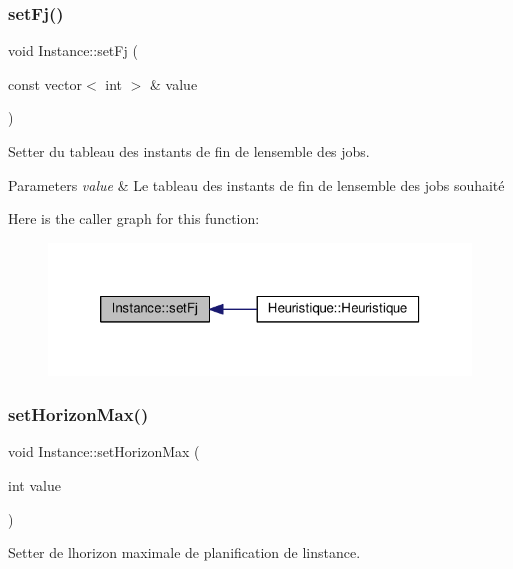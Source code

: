 \subsubsection{\texorpdfstring{set\+Fj()}{setFj()}}
{\footnotesize\ttfamily void Instance\+::set\+Fj (\begin{DoxyParamCaption}\item[{const vector$<$ int $>$ \&}]{value }\end{DoxyParamCaption})}



Setter du tableau des instants de fin de l\textquotesingle{}ensemble des jobs. 


\begin{DoxyParams}{Parameters}
{\em value} & Le tableau des instants de fin de l\textquotesingle{}ensemble des jobs souhaité \\
\hline
\end{DoxyParams}
Here is the caller graph for this function\+:\nopagebreak
\begin{figure}[H]
\begin{center}
\leavevmode
\includegraphics[width=320pt]{classInstance_a3d954198f1caa44f89a61262c14fc716_icgraph}
\end{center}
\end{figure}
\mbox{\label{classInstance_a048579344184b12873bf1d6bceb7ac9e}} 
\subsubsection{\texorpdfstring{set\+Horizon\+Max()}{setHorizonMax()}}
{\footnotesize\ttfamily void Instance\+::set\+Horizon\+Max (\begin{DoxyParamCaption}\item[{int}]{value }\end{DoxyParamCaption})}



Setter de l\textquotesingle{}horizon maximale de planification de l\textquotesingle{}instance. 


